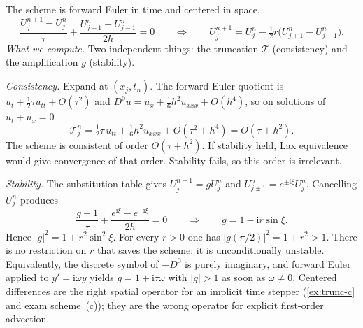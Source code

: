 \documentclass[11pt,a4paper]{article}
\begin{document}
\begin{example}
\label{ex:centered-unstable}
The scheme is forward Euler in time and centered in space,
\[
\frac{U_j^{n+1}-U_j^n}{\tau}
+
\frac{U_{j+1}^n-U_{j-1}^n}{2h}
=0
\qquad\Longleftrightarrow\qquad
U_j^{n+1}
=
U_j^n
-
\tfrac12 r\bigl(U_{j+1}^n-U_{j-1}^n\bigr).
\]
\emph{What we compute.} Two independent things: the truncation \(\mathcal T\) (consistency) and the amplification \(g\) (stability).

\emph{Consistency.} Expand at \((x_j,t_n)\). The forward Euler quotient is \(u_t+\tfrac12\tau u_{tt}+O(\tau^2)\) and \(D^0u=u_x+\tfrac16 h^2 u_{xxx}+O(h^4)\), so on solutions of \(u_t+u_x=0\)
\[
\mathcal T_j^n
=
\tfrac12\tau\,u_{tt}
+
\tfrac16 h^2 u_{xxx}
+
O(\tau^2+h^4)
=
O(\tau+h^2).
\]
The scheme is consistent of order \(O(\tau+h^2)\). If stability held, Lax equivalence would give convergence of that order. Stability fails, so this order is irrelevant.

\emph{Stability.} The substitution table gives \(U_j^{n+1}=g U_j^n\) and \(U_{j\pm 1}^n=e^{\pm\mathrm i\xi}U_j^n\). Cancelling \(U_j^n\) produces
\[
\frac{g-1}{\tau}
+
\frac{e^{\mathrm i\xi}-e^{-\mathrm i\xi}}{2h}
=0
\qquad\Longrightarrow\qquad
g
=
1-\mathrm i r\sin\xi.
\]
Hence \(\lvert g\rvert^2=1+r^2\sin^2\xi\). For every \(r>0\) one has \(\lvert g(\pi/2)\rvert^2=1+r^2>1\). There is no restriction on \(r\) that saves the scheme: it is unconditionally unstable. Equivalently, the discrete symbol of \(-D^0\) is purely imaginary, and forward Euler applied to \(y'=\mathrm i\omega y\) yields \(g=1+\mathrm i\tau\omega\) with \(\lvert g\rvert>1\) as soon as \(\omega\neq 0\). Centered differences are the right spatial operator for an implicit time stepper (\cref{ex:trunc-c} and exam scheme~(c)); they are the wrong operator for explicit first-order advection.
\end{example}
\end{document}
